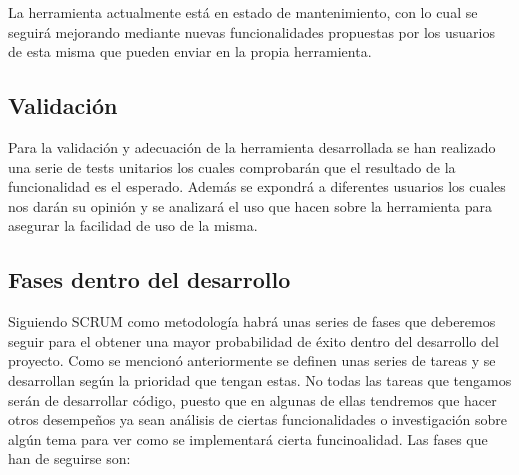 La herramienta actualmente está en estado de mantenimiento, con lo cual se seguirá mejorando
 mediante nuevas funcionalidades propuestas por los usuarios de esta misma que pueden enviar
 en la propia herramienta.

\subsection{Validación}

Para la validación y adecuación de la herramienta desarrollada se han realizado una serie de
 tests unitarios los cuales comprobarán que el resultado de la funcionalidad es el esperado.
 Además se expondrá a diferentes usuarios los cuales nos darán su opinión y se analizará
 el uso que hacen sobre la herramienta para asegurar la facilidad de uso de la misma.

\subsection{Fases dentro del desarrollo}

Siguiendo SCRUM como metodología habrá unas series de fases que deberemos seguir para
 el obtener una mayor probabilidad de éxito dentro del desarrollo del proyecto. Como se
 mencionó anteriormente se definen unas series de tareas y se desarrollan según la prioridad
 que tengan estas. No todas las tareas que tengamos serán de desarrollar código, puesto
 que en algunas de ellas tendremos que hacer otros desempeños ya sean análisis de ciertas
 funcionalidades o investigación sobre algún tema para ver como se implementará cierta
 funcinoalidad. Las fases que han de seguirse son:

